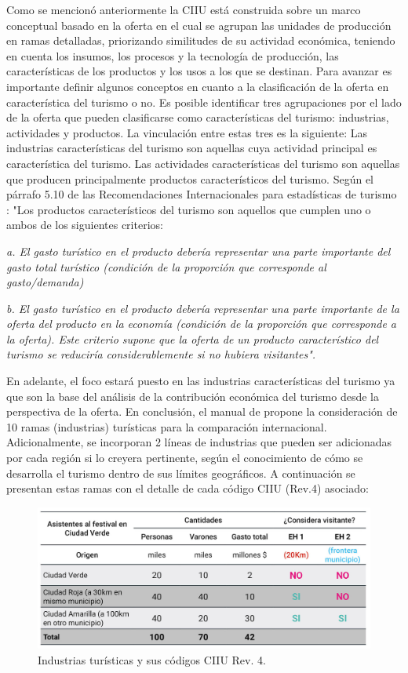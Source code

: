 \documentclass[
  openany]{book}
\begin{document}
Como se mencionó anteriormente la CIIU está construida sobre un marco conceptual basado en la oferta en el cual se agrupan las unidades de producción en ramas detalladas, priorizando similitudes de su actividad económica, teniendo en cuenta los insumos, los procesos y la tecnología de producción, las características de los productos y los usos a los que se destinan. Para avanzar es importante definir algunos conceptos en cuanto a la clasificación de la oferta en característica del turismo o no. Es posible identificar tres agrupaciones por el lado de la oferta que pueden clasificarse como características del turismo: industrias, actividades y productos. La vinculación entre estas tres es la siguiente: Las industrias características del turismo son aquellas cuya actividad principal es característica del turismo. Las actividades características del turismo son aquellas que producen principalmente productos característicos del turismo. Según el párrafo 5.10 de las Recomendaciones Internacionales para estadísticas de turismo \citep{riet2008}: "Los productos característicos del turismo son aquellos que cumplen uno o ambos de los siguientes criterios:

\emph{a. El gasto turístico en el producto debería representar una parte importante del gasto total turístico (condición de la proporción que corresponde al gasto/demanda)}

\emph{b. El gasto turístico en el producto debería representar una parte importante de la oferta del producto en la economía (condición de la proporción que corresponde a la oferta). Este criterio supone que la oferta de un producto característico del turismo se reduciría considerablemente si no hubiera visitantes".}

En adelante, el foco estará puesto en las industrias características del turismo ya que son la base del análisis de la contribución económica del turismo desde la perspectiva de la oferta. En conclusión, el manual de \citet{cstrmc2008} propone la consideración de 10 ramas (industrias) turísticas para la comparación internacional. Adicionalmente, se incorporan 2 líneas de industrias que pueden ser adicionadas por cada región si lo creyera pertinente, según el conocimiento de cómo se desarrolla el turismo dentro de sus límites geográficos. A continuación se presentan estas ramas con el detalle de cada código CIIU (Rev.4) asociado:

\begin{figure}

{\centering \includegraphics[width=0.8\linewidth]{imagenes/figura1.2} 

}

\caption{Industrias turísticas y sus códigos CIIU Rev. 4.}\label{fig:ciiu2}
\end{figure}
\end{document}
